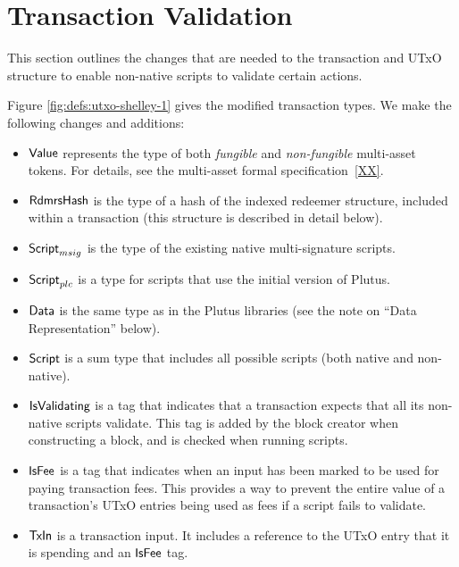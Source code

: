 \section{Transaction Validation}
\label{sec:transactions}

This section outlines the changes that are needed to the transaction and
UTxO structure to enable non-native scripts to validate
certain actions.

Figure \ref{fig:defs:utxo-shelley-1} gives the modified transaction types.
We make the following changes and additions:

\begin{itemize}
  \item $\mathsf{Value}$ represents the type of
  both \emph{fungible} and \emph{non-fungible} multi-asset tokens. For details, see the multi-asset formal specification~\ref{XX}.

  \item $\mathsf{RdmrsHash}$ is the type of a hash of the indexed redeemer structure,
  included within a transaction (this structure is described in detail below).

  \item $\mathsf{Script}_{msig}$ is the type of the existing native multi-signature scripts.

  \item $\mathsf{Script}_{plc}$ is a type for scripts that use the initial version of Plutus.

  \item $\mathsf{Data}$ is the same type as in the Plutus libraries (see the note on ``Data Representation'' below).

  \item $\mathsf{Script}$ is a sum type that includes all possible scripts (both native and non-native).

  \item $\mathsf{IsValidating}$ is a tag that indicates that a transaction
  expects that all its non-native scripts validate.
  This tag is added by the block creator when
  constructing a block, and is checked when running scripts.

  \item $\mathsf{IsFee}$ is a tag that indicates when an input has been marked
    to be used for paying transaction fees.
    This provides a way to prevent
  the entire value of a transaction's UTxO entries being used as fees if a script fails to validate.

  \item $\mathsf{TxIn}$ is a transaction input. It includes a reference to the UTxO entry that it is spending
  and an $\mathsf{IsFee}$ tag.


\end{itemize}
